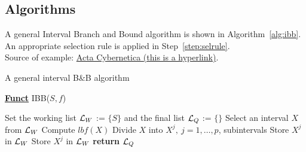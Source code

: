 \subsection{Algorithms}

A general Interval Branch and Bound algorithm is shown in Algorithm~\ref{alg:ibb}. An appropriate selection rule is applied
in Step~\ref{step:selrule}.\\
Source of example: \href{https://www.inf.u-szeged.hu/actacybernetica/}{Acta Cybernetica (this is a hyperlink)}.

\begin{algorithm}[H]
\caption{A general interval B\&B algorithm} 
\label{alg:ibb} 
\textbf{\underline{Funct}} IBB($S,f$)
\begin{algorithmic}[1] %
\State Set the working list ${\cal L}_W$ := $\{S\}$ and the final list ${\cal L}_Q$ := $\{\}$     
 \label{alg:igoend}
	\State  Select an interval $X$ from ${\cal L}_W$ \label{step:selrule}  
	\State Compute $lbf(X)$ 		  
	 
		\State Divide $X$ into $X^j,\ j=1,\dots, p$, subintervals   
			 
				\State Store $X^j$ in ${\cal L}_W$ 
			\Else
				\State Store $X^j$ in ${\cal L}_W$ 
			\EndIf
		\EndFor  
	\EndIf
\EndWhile
\State \textbf{return} ${\cal L}_Q$
\end{algorithmic}
\end{algorithm}
\fi